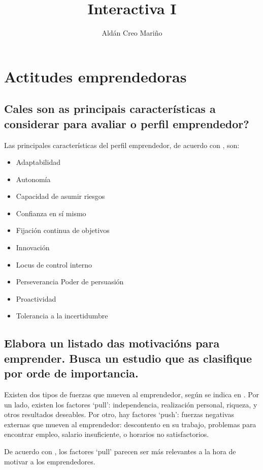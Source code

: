 \documentclass[a4paper]{article}
\title{Interactiva I}
\author{Aldán Creo Mariño}
\begin{document}
\maketitle

\section{Actitudes emprendedoras}
\subsection{Cales son as principais características a considerar para avaliar o perfil emprendedor?}

Las principales características del perfil emprendedor, de acuerdo con \cite{RefWorks:doc:602fadc2c9e77c0001379bac}, son:

\begin{itemize}
    \item Adaptabilidad
    \item Autonomía
    \item Capacidad de asumir riesgos
    \item Confianza en sí mismo
    \item Fijación continua de objetivos
    \item Innovación
    \item Locus de control interno
    \item Perseverancia Poder de persuasión
    \item Proactividad
    \item Tolerancia a la incertidumbre
\end{itemize}

\subsection{Elabora un listado das motivacións para emprender. Busca un estudio que as clasifique por orde de importancia.}

Existen dos tipos de fuerzas que mueven al emprendedor, según se indica en \cite{RefWorks:doc:602fa427c9e77c0001379ab3}. Por un lado, existen los factores `pull': independencia, realización personal, riqueza, y otros resultados deseables. Por otro, hay factores `push': fuerzas negativas externas que mueven al emprendedor: descontento en su trabajo, problemas para encontrar empleo, salario insuficiente, o horarios no satisfactorios.

De acuerdo con \cite{RefWorks:doc:602fab10c9e77c0001379b54}, los factores `pull' parecen ser más relevantes a la hora de motivar a los emprendedores.
\end{document}
